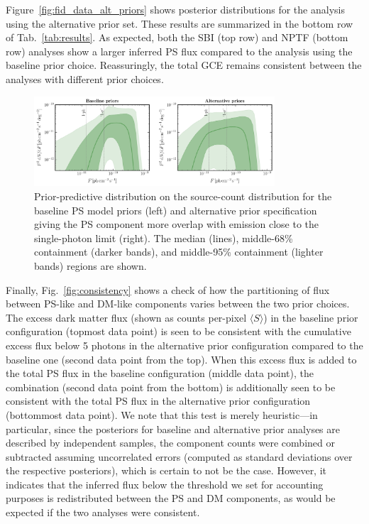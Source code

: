 \documentclass[prd,aps,10pt,nofootinbib,twocolumn,superscriptaddress,preprintnumbers,balancelastpage,longbibliography,floatfix]{revtex4-2}
\begin{document}
Figure~\ref{fig:fid_data_alt_priors} shows posterior distributions for the analysis using the alternative prior set. These results are summarized in the bottom row of Tab.~\ref{tab:results}. As expected, both the SBI (top row) and NPTF (bottom row) analyses show a larger inferred PS flux compared to the analysis using the baseline prior choice. Reassuringly, the total GCE remains consistent between the analyses with different prior choices.

%
\begin{figure}[!t]
\centering
\includegraphics[width=0.8\textwidth]{plots/pp_check.pdf}
\caption{Prior-predictive distribution on the source-count distribution for the baseline PS model priors (left) and alternative prior specification giving the PS component more overlap with emission close to the single-photon limit (right). The median (lines), middle-68\% containment (darker bands), and middle-95\% containment (lighter bands) regions are shown.}
\label{fig:pp_check}
\end{figure}
%

Finally, Fig.~\ref{fig:consistency} shows a check of how the partitioning of flux between PS-like and DM-like components varies between the two prior choices. 
The excess dark matter flux (shown as counts per-pixel $\langle S \rangle$) in the baseline prior configuration (topmost data point) is seen to be consistent with the cumulative excess flux below 5 photons in the alternative prior configuration compared to the baseline one (second data point from the top). When this excess flux is added to the total PS flux in the baseline configuration (middle data point), the combination (second data point from the bottom) is additionally seen to be consistent with the total PS flux in the alternative prior configuration (bottommost data point). We note that this test is merely heuristic---in particular, since the posteriors for baseline and alternative prior analyses are described by independent samples, the component counts were combined or subtracted assuming uncorrelated errors (computed as standard deviations over the respective posteriors), which is certain to not be the case. However, it indicates that the inferred flux below the threshold we set for accounting purposes is redistributed between the PS and DM components, as would be expected if the two analyses were consistent.
\end{document}
